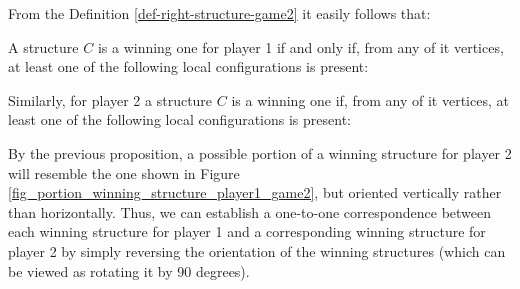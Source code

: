         From the Definition \ref{def-right-structure-game2} it easily follows that:
        \begin{proposition}\label{rigtht-structure-player1-game2}
            A structure $C$ is a winning one for player 1 if and only if, from any of it vertices, at least one of the following local configurations is present: 
            \begin{center}
            \end{center}
       \noindent Similarly, for player 2 a structure $C$ is a winning one if, from any of it vertices, at least one of the following local configurations is present:
       \begin{center}
        \end{center}
        \end{proposition}

        

        By the previous proposition, a possible portion of a winning structure for player 2 will resemble the one shown in Figure \ref{fig_portion_winning_structure_player1_game2}, but oriented vertically rather than horizontally. Thus, we can establish a one-to-one correspondence between each winning structure for player 1 and a corresponding winning structure for player 2 by simply reversing the orientation of the winning structures (which can be viewed as rotating it by 90 degrees).

